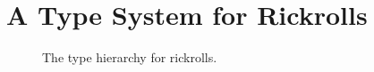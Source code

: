 \section{A Type System for Rickrolls}
\label{sec:rickroll-type-system}

\begin{figure}[ht!]
    \centering
    
    \postfigurespace
    \caption{The type hierarchy for rickrolls.}
    \label{fig:rickroll-type-system}
\end{figure}
